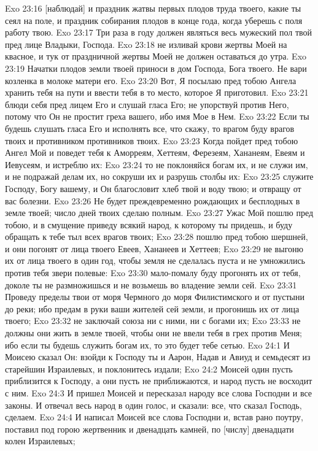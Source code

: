 Exo 23:16  [наблюдай] и праздник жатвы первых плодов труда твоего, какие ты сеял на поле, и праздник собирания плодов в конце года, когда уберешь с поля работу твою.
Exo 23:17  Три раза в году должен являться весь мужеский пол твой пред лице Владыки, Господа.
Exo 23:18  не изливай крови жертвы Моей на квасное, и тук от праздничной жертвы Моей не должен оставаться до утра.
Exo 23:19  Начатки плодов земли твоей приноси в дом Господа, Бога твоего. Не вари козленка в молоке матери его.
Exo 23:20  Вот, Я посылаю пред тобою Ангела хранить тебя на пути и ввести тебя в то место, которое Я приготовил.
Exo 23:21  блюди себя пред лицем Его и слушай гласа Его; не упорствуй против Него, потому что Он не простит греха вашего, ибо имя Мое в Нем.
Exo 23:22  Если ты будешь слушать гласа Его и исполнять все, что скажу, то врагом буду врагов твоих и противником противников твоих.
Exo 23:23  Когда пойдет пред тобою Ангел Мой и поведет тебя к Аморреям, Хеттеям, Ферезеям, Хананеям, Евеям и Иевусеям, и истреблю их:
Exo 23:24  то не поклоняйся богам их, и не служи им, и не подражай делам их, но сокруши их и разрушь столбы их:
Exo 23:25  служите Господу, Богу вашему, и Он благословит хлеб твой и воду твою; и отвращу от вас болезни.
Exo 23:26  Не будет преждевременно рождающих и бесплодных в земле твоей; число дней твоих сделаю полным.
Exo 23:27  Ужас Мой пошлю пред тобою, и в смущение приведу всякий народ, к которому ты придешь, и буду обращать к тебе тыл всех врагов твоих;
Exo 23:28  пошлю пред тобою шершней, и они погонят от лица твоего Евеев, Хананеев и Хеттеев;
Exo 23:29  не выгоню их от лица твоего в один год, чтобы земля не сделалась пуста и не умножились против тебя звери полевые:
Exo 23:30  мало-помалу буду прогонять их от тебя, доколе ты не размножишься и не возьмешь во владение земли сей.
Exo 23:31  Проведу пределы твои от моря Чермного до моря Филистимского и от пустыни до реки; ибо предам в руки ваши жителей сей земли, и прогонишь их от лица твоего;
Exo 23:32  не заключай союза ни с ними, ни с богами их;
Exo 23:33  не должны они жить в земле твоей, чтобы они не ввели тебя в грех против Меня; ибо если ты будешь служить богам их, то это будет тебе сетью.
Exo 24:1  И Моисею сказал Он: взойди к Господу ты и Аарон, Надав и Авиуд и семьдесят из старейшин Израилевых, и поклонитесь издали;
Exo 24:2  Моисей один пусть приблизится к Господу, а они пусть не приближаются, и народ пусть не восходит с ним.
Exo 24:3  И пришел Моисей и пересказал народу все слова Господни и все законы. И отвечал весь народ в один голос, и сказали: все, что сказал Господь, сделаем.
Exo 24:4  И написал Моисей все слова Господни и, встав рано поутру, поставил под горою жертвенник и двенадцать камней, по [числу] двенадцати колен Израилевых;
